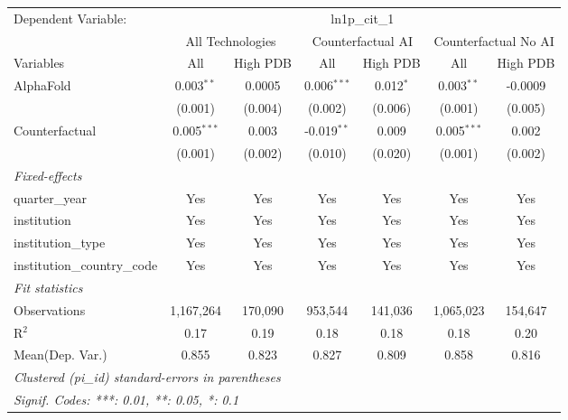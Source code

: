 \begingroup
\centering
\begin{tabular}{lcccccc}
   \tabularnewline \midrule \midrule
   Dependent Variable: & \multicolumn{6}{c}{ln1p\_cit\_1}\\
 & \multicolumn{2}{c}{All Technologies} & \multicolumn{2}{c}{Counterfactual AI} & \multicolumn{2}{c}{Counterfactual No AI} \\
\cmidrule(lr){1-1}\cmidrule(lr){2-3} \cmidrule(lr){4-5} \cmidrule(lr){6-7}
Variables & \multicolumn{1}{c}{All} & \multicolumn{1}{c}{High PDB} & \multicolumn{1}{c}{All} & \multicolumn{1}{c}{High PDB} & \multicolumn{1}{c}{All} & \multicolumn{1}{c}{High PDB} \\
\cmidrule(lr){1-1}\cmidrule(lr){2-2} \cmidrule(lr){3-3} \cmidrule(lr){4-4} \cmidrule(lr){5-5} \cmidrule(lr){6-6} \cmidrule(lr){7-7}
   AlphaFold                    & 0.003$^{**}$  & 0.0005  & 0.006$^{***}$ & 0.012$^{*}$ & 0.003$^{**}$  & -0.0009\\   
                                & (0.001)       & (0.004) & (0.002)       & (0.006)     & (0.001)       & (0.005)\\   
   Counterfactual               & 0.005$^{***}$ & 0.003   & -0.019$^{**}$ & 0.009       & 0.005$^{***}$ & 0.002\\   
                                & (0.001)       & (0.002) & (0.010)       & (0.020)     & (0.001)       & (0.002)\\   
   \midrule
   \emph{Fixed-effects}\\
   quarter\_year                & Yes           & Yes     & Yes           & Yes         & Yes           & Yes\\  
   institution                  & Yes           & Yes     & Yes           & Yes         & Yes           & Yes\\  
   institution\_type            & Yes           & Yes     & Yes           & Yes         & Yes           & Yes\\  
   institution\_country\_code   & Yes           & Yes     & Yes           & Yes         & Yes           & Yes\\  
   \midrule
   \emph{Fit statistics}\\
   Observations                 & 1,167,264     & 170,090 & 953,544       & 141,036     & 1,065,023     & 154,647\\  
   R$^2$                        & 0.17          & 0.19    & 0.18          & 0.18        & 0.18          & 0.20\\  
Mean(Dep. Var.) & 0.855 & 0.823 & 0.827 & 0.809 & 0.858 & 0.816 \\
   \midrule \midrule
   \multicolumn{7}{l}{\emph{Clustered (pi\_id) standard-errors in parentheses}}\\
   \multicolumn{7}{l}{\emph{Signif. Codes: ***: 0.01, **: 0.05, *: 0.1}}\\
\end{tabular}
\par\endgroup
